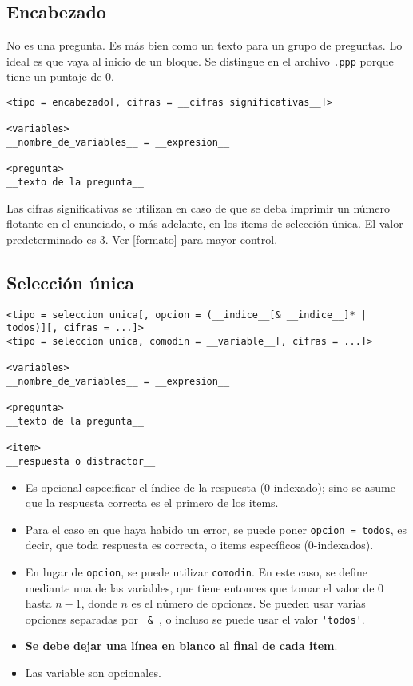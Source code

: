 \documentclass[12pt]{article}
\theoremstyle{definition}
\begin{document}
\subsection{Encabezado}
No es una pregunta. Es más bien como un texto para un grupo de preguntas. Lo ideal es que vaya al inicio de un bloque. Se distingue en el archivo \verb|.ppp| porque tiene un puntaje de 0.

\small
\begin{verbatim}
<tipo = encabezado[, cifras = __cifras significativas__]>

<variables>
__nombre_de_variables__ = __expresion__

<pregunta>
__texto de la pregunta__
\end{verbatim}
\normalsize

Las cifras significativas se utilizan en caso de que se deba imprimir un número flotante en el enunciado, o más adelante, en los items de selección única. El valor predeterminado es 3. Ver \ref{formato} para mayor control.

\subsection{Selección única}

\small
\begin{verbatim}
<tipo = seleccion unica[, opcion = (__indice__[& __indice__]* | todos)][, cifras = ...]>
<tipo = seleccion unica, comodin = __variable__[, cifras = ...]>

<variables>
__nombre_de_variables__ = __expresion__

<pregunta>
__texto de la pregunta__

<item>
__respuesta o distractor__

\end{verbatim}
\normalsize

\begin{itemize}
  \item Es opcional especificar el índice de la respuesta (0-indexado); sino se asume que la respuesta correcta es el primero de los items.
  \item Para el caso en que haya habido un error, se puede poner \verb|opcion = todos|, es decir, que toda respuesta es correcta, o items específicos (0-indexados).
  \item En lugar de \verb|opcion|, se puede utilizar \verb|comodin|. En este caso, se define mediante una de las variables, que tiene entonces que tomar el valor de 0 hasta $n-1$, donde $n$ es el n\'umero de opciones. Se pueden usar varias opciones separadas por \verb| & |, o incluso se puede usar el valor \verb|'todos'|.
  \item \textbf{Se debe dejar una línea en blanco al final de cada item}.
  \item Las variable son opcionales.
\end{itemize}
\end{document}
